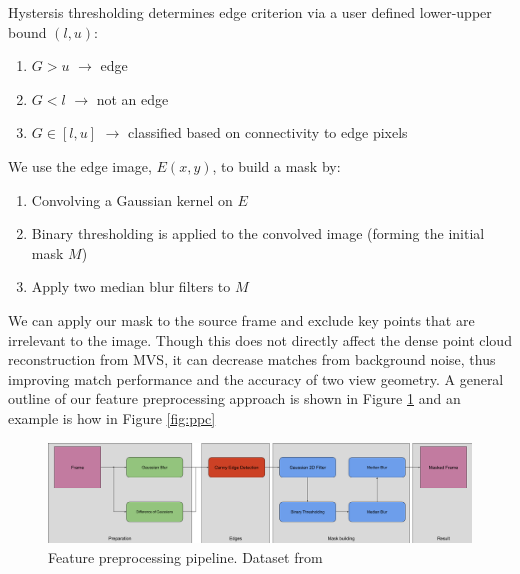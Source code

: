 \documentclass[conference,compsoc]{IEEEtran}
\begin{document}
Hystersis thresholding determines edge criterion via a user defined 
lower-upper bound $(l,u)$:
\begin{enumerate}[i]
    \item $G > u$ $\to$ edge
    \item $G < l$ $\to$ not an edge
    \item $G \in [l,u]$ $\to$ classified based on connectivity to edge pixels
\end{enumerate}
We use the edge image, $E(x,y)$, to build a mask by:
\begin{enumerate}[1.]
    \item Convolving a Gaussian kernel on $E$
    \item Binary thresholding is applied to the convolved image (forming the initial mask $M$)
    \item Apply two median blur filters to $M$
\end{enumerate}
We can apply our mask to the source frame and exclude key points that
are irrelevant to the image. Though this does not directly affect the dense point cloud
reconstruction from MVS, it can decrease matches from background noise, thus 
improving match performance and the accuracy of two view geometry. A general 
outline of our feature preprocessing approach is shown in Figure \ref{fig:ppc_pipe}
and an example is how in Figure \ref{fig:ppc}
\begin{figure}[ht!]
    \centering
    \includegraphics[width=.4\textwidth]{figures/preproc pipeline.png}
    \caption{Feature preprocessing pipeline. Dataset from \cite{viking}}
    \label{fig:ppc_pipe}
\end{figure}
\end{document}
